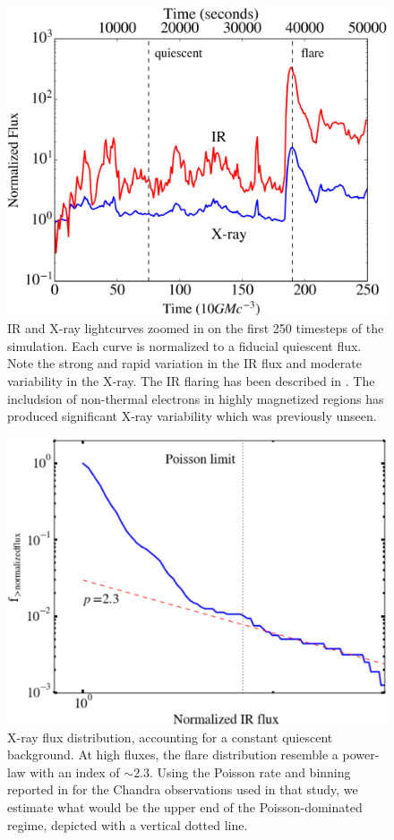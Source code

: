 \begin{figure}
	\centering
	\includegraphics[angle=0,width=\columnwidth]{paper1_fig6}
	\caption{IR and X-ray lightcurves zoomed in on the first 250 timesteps of the simulation.  Each curve is normalized to a fiducial quiescent flux.  Note the strong and rapid variation in the IR flux and moderate variability in the X-ray.  The IR flaring has been described in \citet{chan2015b}.  The includsion of non-thermal electrons in highly magnetized regions has produced significant X-ray variability which was previously unseen.}
	\label{fig6}
\end{figure}

\begin{figure}
	\centering
	\includegraphics[angle=0,width=\columnwidth]{paper1_fig7}
	\caption{X-ray flux distribution, accounting for a constant quiescent background.  At high fluxes, the flare distribution resemble a power-law with an index of $\sim 2.3$.  Using the Poisson rate and binning reported in \citet{neilsen2015} for the Chandra observations used in that study, we estimate what would be the upper end of the Poisson-dominated regime, depicted with a vertical dotted line.}
	\label{fig7}
\end{figure}

